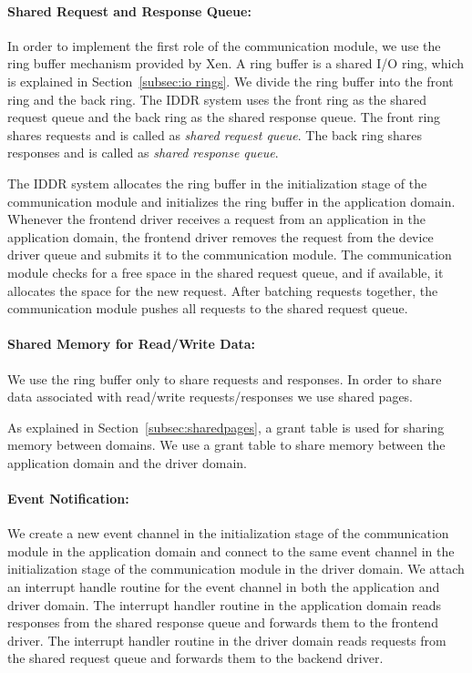\paragraph{Shared Request and Response Queue:}
In order to implement the first role of the communication module, we
use the ring buffer mechanism provided by Xen. A ring buffer is a shared
I/O ring, which is explained in Section~\ref{subsec:io rings}. We divide
the ring buffer into the front ring and the back ring. The IDDR system
uses the front ring as the shared request queue and the back ring as
the shared response queue. The front ring shares requests and is called
as \textit{shared request queue}. The back ring shares responses and is
called as \textit{shared response queue}.

The IDDR system allocates the ring buffer in the initialization stage
of the communication module and initializes the ring buffer in the
application domain. Whenever the frontend driver receives a request from
an application in the application domain, the frontend driver removes the
request from the device driver queue and submits it to the communication
module. The communication module checks for a free space in the shared
request queue, and if available, it allocates the space for the new
request. After batching requests together, the communication module
pushes all requests to the shared request queue.

\paragraph{Shared Memory for Read/Write Data:}
We use the ring buffer only to share requests and responses. In order
to share data associated with read/write requests/responses we use
shared pages.

As explained in Section~\ref{subsec:sharedpages}, a grant table is used
for sharing memory between domains. We use a grant table to share memory
between the application domain and the driver domain.

\paragraph{Event Notification:}
We create a new event channel in the initialization stage of the
communication module in the application domain and connect to the same
event channel in the initialization stage of the communication module
in the driver domain. We attach an interrupt handle routine for the
event channel in both the application and driver domain. The interrupt
handler routine in the application domain reads responses from the shared
response queue and forwards them to the frontend driver. The interrupt
handler routine in the driver domain reads requests from the shared
request queue and forwards them to the backend driver.

